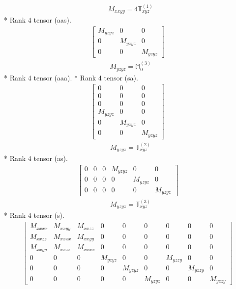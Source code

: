 \documentclass[fleqn,8pt,landscape]{jsarticle}
\begin{document}
\begin{align*}
& M_{xxyy} = 4 \mathbb{T}_{xyz}^{(1)}
\end{align*}
* Rank 4 tensor (aas).
\begin{align*}
\begin{bmatrix} M_{yzyz} & 0 & 0 \\ 0 & M_{yzyz} & 0 \\ 0 & 0 & M_{yzyz} \end{bmatrix}
\end{align*}
\begin{align*}
& M_{yzyz} = \mathbb{M}_{0}^{(3)}
\end{align*}
* Rank 4 tensor (aaa).
* Rank 4 tensor (sa).
\begin{align*}
\begin{bmatrix} 0 & 0 & 0 \\ 0 & 0 & 0 \\ 0 & 0 & 0 \\ M_{yzyz} & 0 & 0 \\ 0 & M_{yzyz} & 0 \\ 0 & 0 & M_{yzyz} \end{bmatrix}
\end{align*}
\begin{align*}
& M_{yzyz} = \mathbb{T}_{xyz}^{(2)}
\end{align*}
* Rank 4 tensor (as).
\begin{align*}
\begin{bmatrix} 0 & 0 & 0 & M_{yzyz} & 0 & 0 \\ 0 & 0 & 0 & 0 & M_{yzyz} & 0 \\ 0 & 0 & 0 & 0 & 0 & M_{yzyz} \end{bmatrix}
\end{align*}
\begin{align*}
& M_{yzyz} = \mathbb{T}_{xyz}^{(3)}
\end{align*}
* Rank 4 tensor (s).
\begin{align*}
\begin{bmatrix} M_{xxxx} & M_{xxyy} & M_{xxzz} & 0 & 0 & 0 & 0 & 0 & 0 \\ M_{xxzz} & M_{xxxx} & M_{xxyy} & 0 & 0 & 0 & 0 & 0 & 0 \\ M_{xxyy} & M_{xxzz} & M_{xxxx} & 0 & 0 & 0 & 0 & 0 & 0 \\ 0 & 0 & 0 & M_{yzyz} & 0 & 0 & M_{yzzy} & 0 & 0 \\ 0 & 0 & 0 & 0 & M_{yzyz} & 0 & 0 & M_{yzzy} & 0 \\ 0 & 0 & 0 & 0 & 0 & M_{yzyz} & 0 & 0 & M_{yzzy} \end{bmatrix}
\end{align*}
\end{document}
